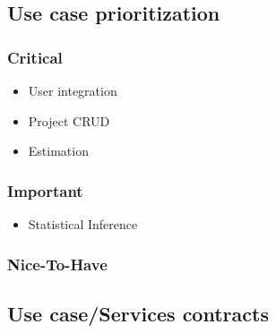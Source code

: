 \subsection{Use case prioritization}
\subsubsection{Critical}
	\begin{itemize}
	\item{User integration}
	\item{Project CRUD}
	\item{Estimation}
	\end{itemize}
\subsubsection{Important}
	\begin{itemize}
	\item{Statistical Inference}
	\end{itemize}
\subsubsection{Nice-To-Have}
\subsection{Use case/Services contracts}

